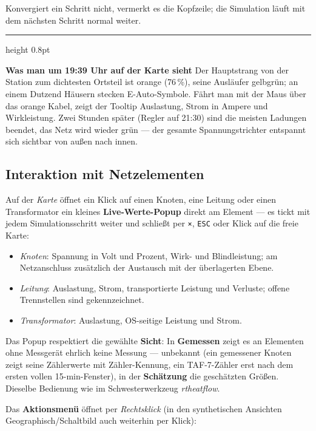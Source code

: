 \documentclass[11pt,a4paper,parskip=half]{scrreprt}
\newcommand{\ui}[1]{\textsf{\bfseries #1}}          %
\newenvironment{beispiel}[1][Beispiel]
  {\par\medskip
   {\color{bsp}\hrule height 0.8pt}\nopagebreak\smallskip
   \noindent\textbf{\textsf{\textcolor{bsp}{#1}}}\quad\ignorespaces}
  {\par\nopagebreak\smallskip{\color{bsp}\hrule height 0.8pt}\par\medskip}
\begin{document}
Konvergiert ein Schritt nicht, vermerkt es die Kopfzeile; die
Simulation läuft mit dem nächsten Schritt normal weiter.

\begin{beispiel}[Was man um 19:39 Uhr auf der Karte sieht]
Der Hauptstrang von der Station zum dichtesten Ortsteil ist orange
(76\,\%), seine Ausläufer gelbgrün; an einem Dutzend Häusern
stecken E-Auto-Symbole. Fährt man mit der Maus über das orange
Kabel, zeigt der Tooltip Auslastung, Strom in Ampere und Wirkleistung.
Zwei Stunden später (Regler auf 21:30) sind die meisten Ladungen
beendet, das Netz wird wieder grün --- der gesamte Spannungstrichter
entspannt sich sichtbar von außen nach innen.
\end{beispiel}

\subsection{Interaktion mit Netzelementen}

Auf der \emph{Karte} öffnet ein Klick auf einen Knoten, eine Leitung
oder einen Transformator ein kleines \textbf{Live-Werte-Popup} direkt
am Element --- es tickt mit jedem Simulationsschritt weiter und
schließt per \texttt{×}, \texttt{ESC} oder Klick auf die freie Karte:

\begin{itemize}[nosep]
  \item \emph{Knoten}: Spannung in Volt und Prozent, Wirk- und
    Blindleistung; am Netzanschluss zusätzlich der Austausch mit der
    überlagerten Ebene.
  \item \emph{Leitung}: Auslastung, Strom, transportierte Leistung
    und Verluste; offene Trennstellen sind gekennzeichnet.
  \item \emph{Transformator}: Auslastung, OS-seitige Leistung und
    Strom.
\end{itemize}

Das Popup respektiert die gewählte \ui{Sicht}: In \ui{Gemessen}
zeigt es an Elementen ohne Messgerät ehrlich \glqq keine Messung ---
unbekannt\grqq{} (ein gemessener Knoten zeigt seine Zählerwerte mit
Zähler-Kennung, ein TAF-7-Zähler erst nach dem ersten vollen
15-min-Fenster), in der \ui{Schätzung} die geschätzten Größen.
Dieselbe Bedienung wie im Schwesterwerkzeug \emph{rtheatflow}.

Das \textbf{Aktionsmenü} öffnet per \emph{Rechtsklick} (in den
synthetischen Ansichten Geographisch/Schaltbild auch weiterhin per
Klick):
\end{document}
